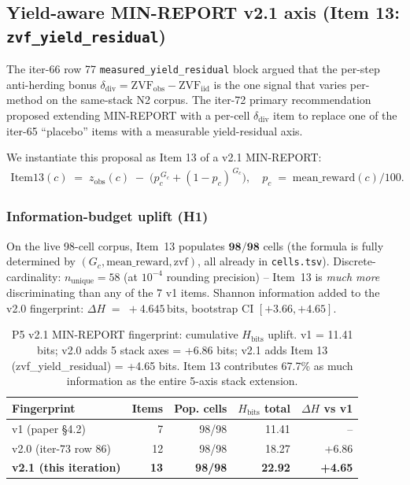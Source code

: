 \subsection{Yield-aware MIN-REPORT v2.1 axis (Item 13: \texttt{zvf\_yield\_residual})}
\label{sec:p5-iter80-yield}

The iter-66 row 77 \texttt{measured\_yield\_residual} block argued that the
per-step anti-herding bonus
$\delta_{\mathrm{div}} = \mathrm{ZVF}_{\mathrm{obs}} - \mathrm{ZVF}_{\mathrm{iid}}$ is the
one signal that varies per-method on the same-stack N2 corpus. The
iter-72 primary recommendation proposed extending MIN-REPORT with a
per-cell $\delta_{\mathrm{div}}$ item to replace one of the iter-65
``placebo'' items with a measurable yield-residual axis.

We instantiate this proposal as Item 13 of a v2.1 MIN-REPORT:
\begin{align}
  \mathrm{Item13}(c) \;=\; z_{\mathrm{obs}}(c) \;-\; \bigl(p_c^{\,G_c} + (1-p_c)^{\,G_c}\bigr),
\quad p_c \;=\; \mathrm{mean\_reward}(c)/100.
\label{eq:item13}
\end{align}

\subsubsection{Information-budget uplift (H1)}
On the live 98-cell corpus, Item~13 populates $\mathbf{98/98}$ cells (the
formula is fully determined by $(G_c, \mathrm{mean\_reward}, \mathrm{zvf})$,
all already in \texttt{cells.tsv}). Discrete-cardinality:
$n_{\mathrm{unique}} = 58$ (at $10^{-4}$ rounding precision) -- Item~13 is
\emph{much more} discriminating than any of the 7 v1 items. Shannon
information added to the v2.0 fingerprint:
$\Delta H \;=\; +4.645\,\mathrm{bits}$, bootstrap CI $[+3.66, +4.65]$.

\begin{table}[ht]
\centering
\small
\caption{P5 v2.1 MIN-REPORT fingerprint: cumulative $H_{\mathrm{bits}}$ uplift.
v1 = 11.41 bits; v2.0 adds 5 stack axes = +6.86 bits; v2.1 adds Item 13
(zvf\_yield\_residual) = +4.65 bits. Item 13 contributes 67.7\% as much
information as the entire 5-axis stack extension.}
\label{tab:p5-v21-uplift}
\begin{tabular}{l r r r r}
\toprule
Fingerprint & Items & Pop. cells & $H_{\mathrm{bits}}$ total & $\Delta H$ vs v1 \\
\midrule
v1 (paper §4.2)        & 7 & 98/98 & 11.41 & -- \\
v2.0 (iter-73 row 86)  & 12 & 98/98 & 18.27 & +6.86 \\
\textbf{v2.1 (this iteration)} & \textbf{13} & \textbf{98/98} & \textbf{22.92} & \textbf{+4.65} \\
\bottomrule
\end{tabular}
\end{table}

